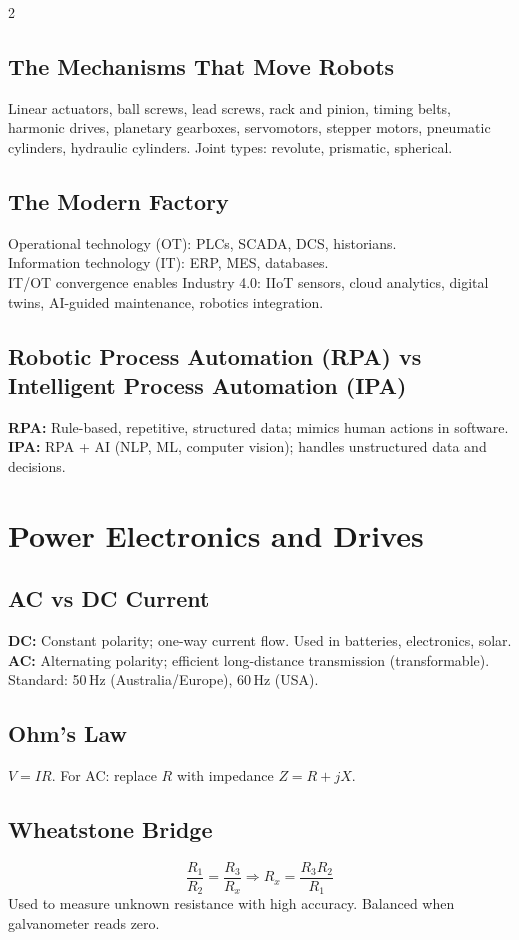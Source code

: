 \documentclass[10pt,a4paper]{article}
\begin{document}
\begin{multicols}{2}
\subsection{The Mechanisms That Move Robots}
Linear actuators, ball screws, lead screws, rack and pinion, timing belts, harmonic drives, planetary gearboxes, servomotors, stepper motors, pneumatic cylinders, hydraulic cylinders. Joint types: revolute, prismatic, spherical.

\subsection{The Modern Factory}
Operational technology (OT): PLCs, SCADA, DCS, historians.\\
Information technology (IT): ERP, MES, databases.\\
IT/OT convergence enables Industry 4.0: IIoT sensors, cloud analytics, digital twins, AI-guided maintenance, robotics integration.

\subsection{Robotic Process Automation (RPA) vs Intelligent Process Automation (IPA)}
\textbf{RPA:} Rule-based, repetitive, structured data; mimics human actions in software.\\
\textbf{IPA:} RPA + AI (NLP, ML, computer vision); handles unstructured data and decisions.

\section{Power Electronics and Drives}

\subsection{AC vs DC Current}
\textbf{DC:} Constant polarity; one-way current flow. Used in batteries, electronics, solar.\\
\textbf{AC:} Alternating polarity; efficient long-distance transmission (transformable). Standard: 50\,Hz (Australia/Europe), 60\,Hz (USA).

\subsection{Ohm's Law}
$V = IR$. For AC: replace $R$ with impedance $Z = R + jX$.

\subsection{Wheatstone Bridge}
\[
\frac{R_1}{R_2} = \frac{R_3}{R_x} \Rightarrow R_x = \frac{R_3 R_2}{R_1}
\]
Used to measure unknown resistance with high accuracy. Balanced when galvanometer reads zero.


\end{multicols}
\end{document}
